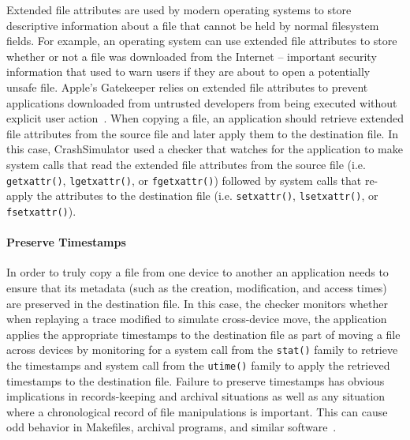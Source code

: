 Extended file attributes are used by modern
operating systems to store descriptive information about a file that cannot be
held by normal filesystem fields.  For example, an operating system can use
extended file attributes to store whether or not a file was downloaded from the
Internet -- important security information that used to warn
users if they are about to open a potentially unsafe file.  Apple's Gatekeeper
relies on extended file attributes to prevent applications downloaded from
untrusted developers from being executed without explicit user action~\cite{AppleCodeSigning}.
When copying a file,
an application should retrieve extended file attributes from the source
file and later apply them to the destination file.
In this case, CrashSimulator used a checker
that watches for the application to make system calls
that read the extended file attributes from the source file (i.e. {\tt
  getxattr()}, {\tt lgetxattr()}, or {\tt fgetxattr()}) followed by system calls
that re-apply the attributes to the destination file (i.e. {\tt setxattr()},
{\tt lsetxattr()}, or {\tt fsetxattr()}).

\paragraph{Preserve Timestamps}

In order to truly copy a file from one device
to another an application needs to ensure that its metadata (such as the 
creation, modification, and access times) are preserved in the destination 
file.  
In this case, the checker monitors
whether when replaying a trace modified to simulate cross-device move,
the application applies
the appropriate timestamps to the destination file as part of moving a file
across devices by monitoring for a system call from the {\tt stat()} family to
retrieve the timestamps and system call from the {\tt utime()} family to apply
the retrieved timestamps to the destination file.
Failure to preserve timestamps has obvious
implications in records-keeping and archival situations as well as any situation
where a chronological record of file manipulations is important.  This can 
cause odd behavior in Makefiles, archival programs, and similar
software~\cite{NautilusTimestamps, SudoTimestamp}.

